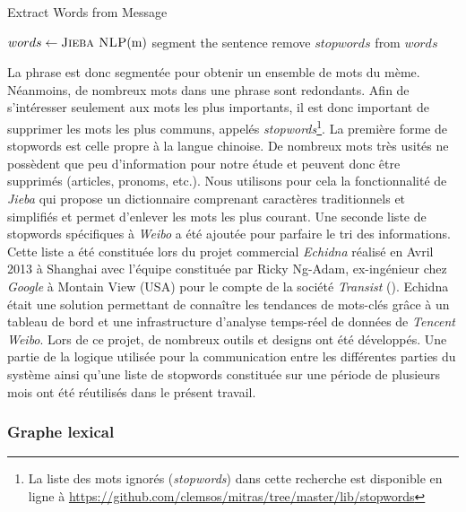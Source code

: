    \begin{algorithm}[htpb]
        \caption{Extract Words from Message}
        \label{algo:message-graph}
        \begin{algorithmic}

                \State $words \gets \Call{Jieba NLP}{$m$}$ segment the sentence
                \State remove $stopwords$ from $words$                

        \end{algorithmic}
    \end{algorithm}

    La phrase est donc segmentée  pour obtenir un ensemble de mots du mème. Néanmoins, de nombreux mots dans une phrase sont redondants. Afin de s'intéresser seulement aux mots les plus importants, il est donc important de  supprimer les mots les plus communs, appelés \textit{stopwords}\footnote{La liste des mots ignorés (\textit{stopwords}) dans cette recherche est disponible en ligne à \url{https://github.com/clemsos/mitras/tree/master/lib/stopwords}}. La première forme de stopwords est celle propre à la langue chinoise. De nombreux mots très usités ne possèdent que peu d'information pour notre étude et peuvent donc être supprimés (articles, pronoms, etc.). Nous utilisons pour cela la fonctionnalité de \textit{Jieba} qui propose un dictionnaire comprenant caractères traditionnels et simplifiés et permet d'enlever les mots les plus courant. Une seconde liste de stopwords spécifiques à \textit{Weibo} a été ajoutée pour parfaire le tri des informations. Cette liste a été constituée lors du projet commercial \textit{Echidna} réalisé en Avril 2013 à Shanghai avec l'équipe constituée par Ricky Ng-Adam, ex-ingénieur chez \textit{Google} à Montain View (USA) pour le compte de la société \textit{Transist} (). Echidna était une solution permettant de connaître les tendances de mots-clés grâce à un tableau de bord et une infrastructure d'analyse temps-réel de données de \textit{Tencent Weibo}. Lors de ce projet, de nombreux outils et designs ont été développés. Une partie de la logique utilisée pour la communication entre les différentes parties du système ainsi qu'une liste de stopwords constituée sur une période de plusieurs mois ont été réutilisés dans le présent travail.
    
\subsubsection{Graphe lexical}

